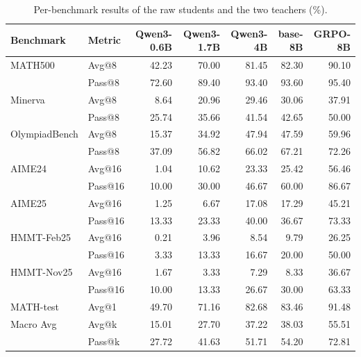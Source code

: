 \documentclass[10pt]{article}
\begin{document}
\begin{table}[h]
\centering
\scriptsize
\caption{Per-benchmark results of the raw students and the two teachers (\%).}
\label{tab:app-base}
\begin{tabular}{llrrrrr}
\toprule
Benchmark & Metric & Qwen3-0.6B & Qwen3-1.7B & Qwen3-4B & base-8B & GRPO-8B \\
\midrule
MATH500 & Avg@8 & 42.23 & 70.00 & 81.45 & 82.30 & 90.10 \\
 & Pass@8 & 72.60 & 89.40 & 93.40 & 93.60 & 95.40 \\
Minerva & Avg@8 & 8.64 & 20.96 & 29.46 & 30.06 & 37.91 \\
 & Pass@8 & 25.74 & 35.66 & 41.54 & 42.65 & 50.00 \\
OlympiadBench & Avg@8 & 15.37 & 34.92 & 47.94 & 47.59 & 59.96 \\
 & Pass@8 & 37.09 & 56.82 & 66.02 & 67.21 & 72.26 \\
AIME24 & Avg@16 & 1.04 & 10.62 & 23.33 & 25.42 & 56.46 \\
 & Pass@16 & 10.00 & 30.00 & 46.67 & 60.00 & 86.67 \\
AIME25 & Avg@16 & 1.25 & 6.67 & 17.08 & 17.29 & 45.21 \\
 & Pass@16 & 13.33 & 23.33 & 40.00 & 36.67 & 73.33 \\
HMMT-Feb25 & Avg@16 & 0.21 & 3.96 & 8.54 & 9.79 & 26.25 \\
 & Pass@16 & 3.33 & 13.33 & 16.67 & 20.00 & 50.00 \\
HMMT-Nov25 & Avg@16 & 1.67 & 3.33 & 7.29 & 8.33 & 36.67 \\
 & Pass@16 & 10.00 & 13.33 & 26.67 & 30.00 & 63.33 \\
MATH-test & Avg@1 & 49.70 & 71.16 & 82.68 & 83.46 & 91.48 \\
\midrule
Macro Avg & Avg@k & 15.01 & 27.70 & 37.22 & 38.03 & 55.51 \\
 & Pass@k & 27.72 & 41.63 & 51.71 & 54.20 & 72.81 \\
\bottomrule
\end{tabular}
\end{table}
\end{document}
